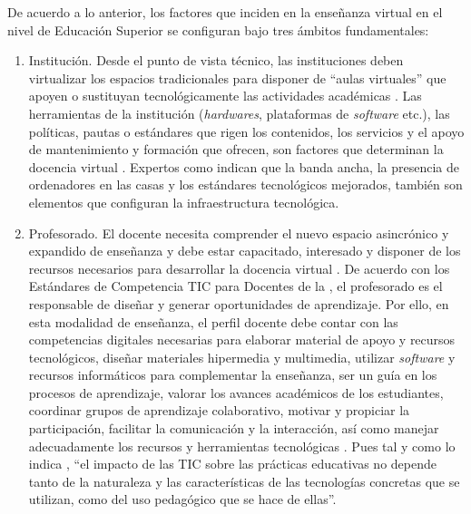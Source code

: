 \documentclass[spanish]{textolivre}
\begin{document}
De acuerdo a lo anterior, los factores que inciden en la enseñanza virtual en el nivel de Educación Superior se configuran bajo tres ámbitos fundamentales:

\begin{enumerate}[label=\alph*.]
    \item Institución. Desde el punto de vista técnico, las instituciones deben virtualizar los espacios tradicionales para disponer de “aulas virtuales” que apoyen o sustituyan tecnológicamente las actividades académicas \cite{peterman_elements_2000}. Las herramientas de la institución (\textit{hardwares}, plataformas de \textit{software} etc.), las políticas, pautas o estándares que rigen los contenidos, los servicios y el apoyo de mantenimiento y formación que ofrecen, son factores que determinan la docencia virtual \cite{ko_teaching_2017}. Expertos como \textcite{clarke_corporate_2001} indican que la banda ancha, la presencia de ordenadores en las casas y los estándares tecnológicos mejorados, también son elementos que configuran la infraestructura tecnológica.
    \item Profesorado. El docente necesita comprender el nuevo espacio asincrónico y expandido de enseñanza y debe estar capacitado, interesado y disponer de los recursos necesarios para desarrollar la docencia virtual \cite{fernandez_cruz_formacion_2015}. De acuerdo con los Estándares de Competencia TIC para Docentes de la \textcite[p. 2]{unesco_estandares_2008}, el profesorado es el responsable de diseñar y generar oportunidades de aprendizaje. Por ello, en esta modalidad de enseñanza, el perfil docente debe contar con las competencias digitales necesarias para elaborar material de apoyo y recursos tecnológicos, diseñar materiales hipermedia y multimedia, utilizar \textit{software} y recursos informáticos para complementar la enseñanza, ser un guía en los procesos de aprendizaje, valorar los avances académicos de los estudiantes, coordinar grupos de aprendizaje colaborativo, motivar y propiciar la participación, facilitar la comunicación y la interacción, así como manejar adecuadamente los recursos y herramientas tecnológicas \cite{peterman_elements_2000,unesco_estandares_2008,tagliapietra_campus_2017}. Pues tal y como lo indica \textcite[p. 18]{coll_psicologieducacion_2004}, “el impacto de las TIC sobre las prácticas educativas no depende tanto de la naturaleza y las características de las tecnologías concretas que se utilizan, como del uso pedagógico que se hace de ellas”.

\end{enumerate}
\end{document}

